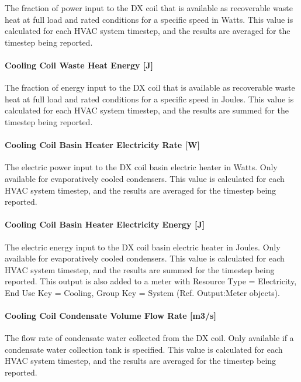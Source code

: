 The fraction of power input to the DX coil that is available as recoverable waste heat at full load and rated conditions for a specific speed in Watts. This value is calculated for each HVAC system timestep, and the results are averaged for the timestep being reported.

\paragraph{Cooling Coil Waste Heat Energy {[}J{]}}

The fraction of energy input to the DX coil that is available as recoverable waste heat at full load and rated conditions for a specific speed in Joules. This value is calculated for each HVAC system timestep, and the results are summed for the timestep being reported.

\paragraph{Cooling Coil Basin Heater Electricity Rate {[}W{]}}

The electric power input to the DX coil basin electric heater in Watts. Only available for evaporatively cooled condensers. This value is calculated for each HVAC system timestep, and the results are averaged for the timestep being reported.

\paragraph{Cooling Coil Basin Heater Electricity Energy {[}J{]}}

The electric energy input to the DX coil basin electric heater in Joules. Only available for evaporatively cooled condensers. This value is calculated for each HVAC system timestep, and the results are summed for the timestep being reported. This output is also added to a meter with Resource Type = Electricity, End Use Key = Cooling, Group Key = System (Ref. Output:Meter objects).

\paragraph{Cooling Coil Condensate Volume Flow Rate {[}m3/s{]}}

The flow rate of condensate water collected from the DX coil. Only available if a condensate water collection tank is specified. This value is calculated for each HVAC system timestep, and the results are averaged for the timestep being reported.

